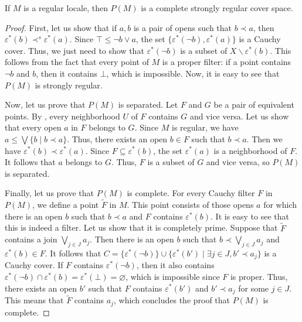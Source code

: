 \documentclass[reqno]{amsart}
\theoremstyle{definition}
\theoremstyle{remark}
\numberwithin{figure}{section}
\newcommand{\rb}{\prec}
\begin{document}
\begin{prop}
If $M$ is a regular locale, then $P(M)$ is a complete strongly regular cover space.
\end{prop}
\begin{proof}
First, let us show that if $a,b$ is a pair of opens such that $b \rb a$, then $\varepsilon^*(b) \rb^s \varepsilon^*(a)$.
Since $\top \leq \neg b \vee a$, the set $\{ \varepsilon^*(\neg b), \varepsilon^*(a) \}$ is a Cauchy cover.
Thus, we just need to show that $\varepsilon^*(\neg b)$ is a subset of $X \backslash \varepsilon^*(b)$.
This follows from the fact that every point of $M$ is a proper filter: if a point contains $\neg b$ and $b$, then it contains $\bot$, which is impossible.
Now, it is easy to see that $P(M)$ is strongly regular.

Now, let us prove that $P(M)$ is separated.
Let $F$ and $G$ be a pair of equivalent points.
By , every neighborhood $U$ of $F$ contains $G$ and vice versa.
Let us show that every open $a$ in $F$ belongs to $G$.
Since $M$ is regular, we have $a \leq \bigvee \{ b \mid b \rb a \}$.
Thus, there exists an open $b \in F$ such that $b \rb a$.
Then we have $\varepsilon^*(b) \rb \varepsilon^*(a)$.
Since $F \subseteq \varepsilon^*(b)$, the set $\varepsilon^*(a)$ is a neighborhood of $F$.
It follows that $a$ belongs to $G$.
Thus, $F$ is a subset of $G$ and vice versa, so $P(M)$ is separated.

Finally, let us prove that $P(M)$ is complete.
For every Cauchy filter $F$ in $P(M)$, we define a point $\widetilde{F}$ in $M$.
This point consists of those opens $a$ for which there is an open $b$ such that $b \rb a$ and $F$ contains $\varepsilon^*(b)$.
It is easy to see that this is indeed a filter.
Let us show that it is completely prime.
Suppose that $\widetilde{F}$ contains a join $\bigvee_{j \in J} a_j$.
Then there is an open $b$ such that $b \rb \bigvee_{j \in J} a_j$ and $\varepsilon^*(b) \in F$.
It follows that $C = \{ \varepsilon^*(\neg b) \} \cup \{ \varepsilon^*(b') \mid \exists j \in J, b' \rb a_j \}$ is a Cauchy cover.
If $F$ contains $\varepsilon^*(\neg b)$, then it also contains $\varepsilon^*(\neg b) \cap \varepsilon^*(b) = \varepsilon^*(\bot) = \varnothing$, which is impossible since $F$ is proper.
Thus, there exists an open $b'$ such that $F$ contains $\varepsilon^*(b')$ and $b' \rb a_j$ for some $j \in J$.
This means that $\widetilde{F}$ contains $a_j$, which concludes the proof that $P(M)$ is complete.
\end{proof}
\end{document}

